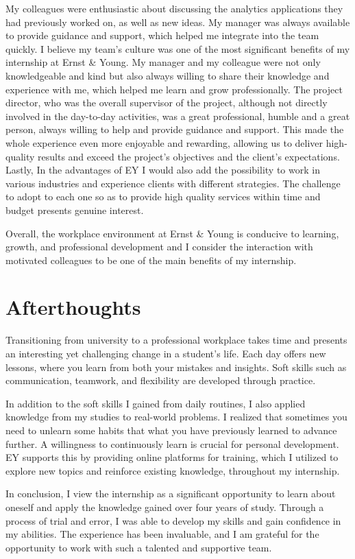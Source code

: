 My colleagues were enthusiastic about discussing the analytics applications
they had previously worked on, as well as new ideas. My manager was always
available to provide guidance and support, which helped me integrate into the
team quickly. I believe my team's culture was one of the most significant
benefits of my internship at Ernst \& Young. My manager and my colleague were
not only knowledgeable and kind but also always willing to share their
knowledge and experience with me, which helped me learn and grow
professionally. The project director, who was the overall supervisor of the
project, although not directly involved in the day-to-day activities, was a
great professional, humble and a great person, always willing to help and
provide guidance and support. This made the whole experience even more
enjoyable and rewarding, allowing us to deliver high-quality results and exceed
the project's objectives and the client's expectations. Lastly, In the
advantages of EY I would also add the possibility to work in various industries
and experience clients with different strategies. The challenge to adopt to
each one so as to provide high quality services within time and budget presents
genuine interest.

Overall, the workplace environment at Ernst \& Young is conducive to learning,
growth, and professional development and I consider the interaction with
motivated colleagues to be one of the main benefits of my internship.

\section{Afterthoughts}

Transitioning from university to a professional workplace takes time and
presents an interesting yet challenging change in a student's life. Each day
offers new lessons, where you learn from both your mistakes and insights. Soft
skills such as communication, teamwork, and flexibility are developed through
practice.

In addition to the soft skills I gained from daily routines, I also applied
knowledge from my studies to real-world problems. I realized that sometimes you
need to unlearn some habits that what you have previously learned to advance
further. A willingness to continuously learn is crucial for personal
development. EY supports this by providing online platforms for training, which
I utilized to explore new topics and reinforce existing knowledge, throughout
my internship.

In conclusion, I view the internship as a significant opportunity to learn
about oneself and apply the knowledge gained over four years of study. Through
a process of trial and error, I was able to develop my skills and gain
confidence in my abilities. The experience has been invaluable, and I am
grateful for the opportunity to work with such a talented and supportive team.